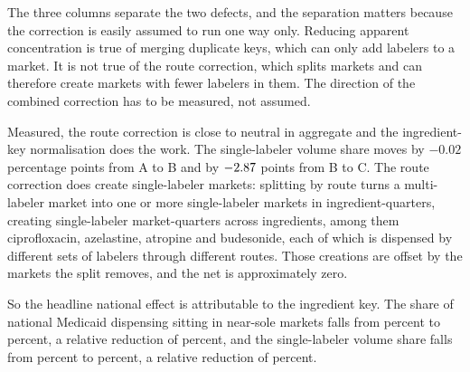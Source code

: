 \documentclass[pdflatex,sn-vancouver-num,Numbered]{sn-jnl}
\begin{document}
\begin{table}[htbp]
\caption{Supplier concentration across all market-quarters, 2016Q1 to 2026Q1, under the three
specifications. Volume shares are of all \nTotalRxB billion reimbursed prescriptions in the
panel.}\label{tab:impact}

\end{table}

The three columns separate the two defects, and the separation matters because the correction is
easily assumed to run one way only. Reducing apparent concentration is true of merging
duplicate keys, which can only add labelers to a market. It is not true of the route correction,
which splits markets and can therefore create markets with fewer labelers in them. The direction
of the combined correction has to be measured, not assumed.

Measured, the route correction is close to neutral in aggregate and the ingredient-key
normalisation does the work. The single-labeler volume share moves by $-0.02$ percentage points
from A to B and by $-2.87$ points from B to C. The route correction does create single-labeler
markets: splitting by route turns a multi-labeler market into one or more single-labeler markets
in \nRouteSplitQuarters ingredient-quarters, creating \nRouteSplitCreated single-labeler
market-quarters across \nRouteSplitIngredients ingredients,
among them ciprofloxacin, azelastine, atropine and budesonide, each of which is dispensed by
different sets of labelers through different routes. Those creations are offset by the markets
the split removes, and the net is approximately zero.

So the headline national effect is attributable to the ingredient key. The share of national
Medicaid dispensing sitting in near-sole markets falls from \nNearSoleVolA percent to \nNearSoleVolC percent, a
relative reduction of \nRelRedNearSole percent, and the single-labeler volume share falls from
\nSingleVolA percent to \nSingleVolC percent, a relative reduction of \nRelRedSingle percent.
\end{document}
